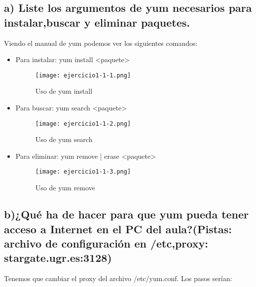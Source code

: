 	
	\subsection{a) Liste los argumentos de yum necesarios para instalar,buscar y eliminar paquetes.}
	
	Viendo el manual de yum\cite{ejercicio1-1} podemos ver los siguientes comandos:
	 
	\begin{itemize}
		
		\item Para instalar: yum install <paquete> 
			\begin{figure}[H] 
				\centering
				\texttt{[image: ejercicio1-1-1.png]} 
				\label{figura1} 
				\caption{Uso de yum install}
			\end{figure} 
			
		\item Para buscar: yum search <paquete>
			 \begin{figure}[H] 
			 	\centering
			 	\texttt{[image: ejercicio1-1-2.png]} 
			 	\label{figura2} 
			 	\caption{Uso de yum search}
			 \end{figure}
			 
		\item Para eliminar: yum remove | erase <paquete>
			\begin{figure}[H] 
				\centering
				\texttt{[image: ejercicio1-1-3.png]} 
				\label{figura3} 
				\caption{Uso de yum remove}
			\end{figure} 
			
	\end{itemize}
	
	\subsection{b)¿Qué ha de hacer para que yum pueda tener acceso a Internet en el PC del aula?(Pistas: archivo de configuración en /etc,proxy: stargate.ugr.es:3128)}
	
	Tenemos que cambiar el proxy del archivo /etc/yum.conf\cite{ejercicio1-2}. Los pasos serían:
	
